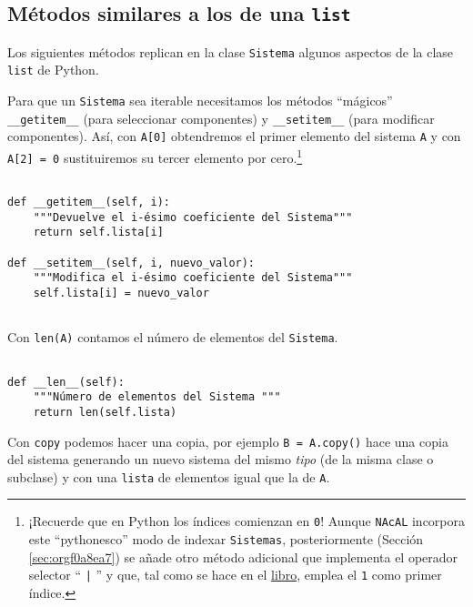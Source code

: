 \documentclass[11pt]{report}
\begin{document}
\medskip

\subsection{Métodos similares a los de una \texttt{list}}
\label{sec:orga7965bb}
Los siguientes métodos replican en la clase \texttt{Sistema} algunos aspectos de la clase \texttt{list} de Python.

Para que un \texttt{Sistema} sea iterable necesitamos los métodos ``mágicos'' \texttt{\_\_getitem\_\_} (para
seleccionar componentes) y \texttt{\_\_setitem\_\_} (para modificar componentes).  Así, con \texttt{A[0]} obtendremos
el primer elemento del sistema \texttt{A} y con \texttt{A[2] = 0} sustituiremos su tercer elemento por cero.\footnote{¡Recuerde que en Python los índices comienzan en \texttt{0}!  Aunque \texttt{NAcAL} incorpora este ``pythonesco''
modo de indexar \texttt{Sistemas}, posteriormente (Sección \ref{sec:orgf0a8ea7}) se añade otro método adicional que implementa el operador selector
`` \texttt{|} '' y que, tal como se hace en el \href{https://mbujosab.github.io/CursoDeAlgebraLineal/libro.pdf\#chapter.1}{libro}, emplea el \texttt{1} como primer índice.}

\begin{verbatim}

def __getitem__(self, i):
    """Devuelve el i-ésimo coeficiente del Sistema"""
    return self.lista[i]

def __setitem__(self, i, nuevo_valor):
    """Modifica el i-ésimo coeficiente del Sistema"""
    self.lista[i] = nuevo_valor
        
\end{verbatim}

Con \texttt{len(A)} contamos el número de elementos del \texttt{Sistema}. 

\begin{verbatim}

def __len__(self):
    """Número de elementos del Sistema """
    return len(self.lista)

\end{verbatim}

Con \texttt{copy} podemos hacer una copia, por ejemplo \texttt{B = A.copy()} hace una copia del sistema 
generando un nuevo sistema del mismo \emph{tipo} (de la misma clase o subclase) y con una \texttt{lista} de
elementos igual que la de \texttt{A}.
\end{document}
